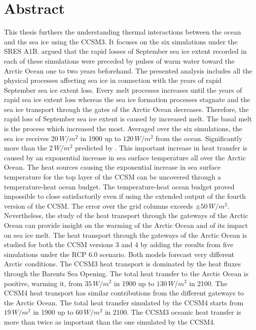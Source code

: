 \section*{Abstract}

This thesis furthers the understanding thermal interactions between the ocean and the sea ice using the CCSM3. It focuses on the six simulations under the SRES A1B. \cite{ISI:000242942100008} argued that the rapid losses of September sea ice extent recorded in each of these simulations were preceded by pulses of warm water toward the Arctic Ocean one to two years beforehand. The presented analysis includes all the physical processes affecting sea ice in connection with the years of rapid September sea ice extent loss. Every melt processes increases until the years of rapid sea ice extent loss whereas the sea ice formation processes stagnate and the sea ice transport through the gates of the Arctic Ocean decreases. Therefore, the rapid loss of September sea ice extent is caused by increased melt. The basal melt is the process which increased the most. Averaged over the six simulations, the sea ice receives $20\,W/m^2$ in 1900  up to $120\,W/m^2$ from the ocean. Significantly more than the $2\,W/m^2$ predicted by \cite{ISI:A1971I688400007}. This important increase in heat transfer is caused by an exponential increase in sea surface temperature all over the Arctic Ocean. The heat sources causing the exponential increase in sea surface temperature for the top layer of the CCSM can be uncovered through a temperature-heat ocean budget. The temperature-heat ocean budget proved impossible to close satisfactorily even if using the extended output of the fourth version of the CCSM. The error over the grid columns exceeds $\pm 50\,W/m^2$. Nevertheless, the study of the heat transport through the gateways of the Arctic Ocean can provide insight on the warming of the Arctic Ocean and of its impact on sea ice melt. The heat transport through the gateways of the Arctic Ocean is studied for both the CCSM versions 3 and 4 by adding the results from five simulations under the RCP 6.0 scenario. Both models forecast very different Arctic conditions. The CCSM3 heat transport is dominated by the heat fluxes through the Barents Sea Opening. The total heat transfer to the Arctic Ocean is positive, warming it, from $35\,W/m^2$ in 1900 up to $130\,W/m^2$ in 2100. The CCSM4 heat transport has similar contributions from the different gateways to the Arctic Ocean. The total heat transfer simulated by the CCSM4 starts from $19\,W/m^2$ in 1900 up to $60\,W/m^2$ in 2100. The CCSM3 oceanic heat transfer is more than twice as important than the one simulated by the CCSM4.  


 























